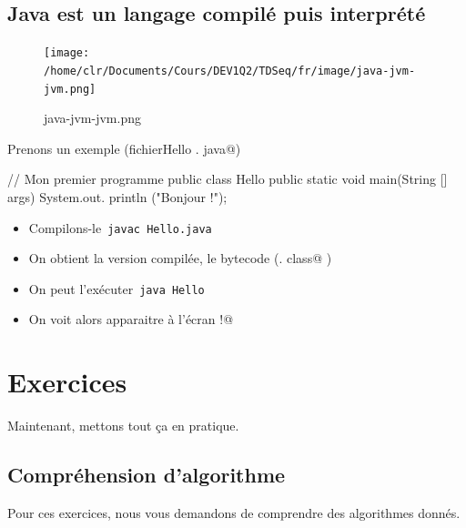 \documentclass[11pt,a4paper]{article}
\begin{document}
            \par
        \subsection{Java est un langage compil\'e puis interpr\'et\'e}\begin{figure}[hbt]
				    \begin{center}
					\texttt{[image: /home/clr/Documents/Cours/DEV1Q2/TDSeq/fr/image/java-jvm-jvm.png]}
						\end{center}
                
                    \caption[java-jvm-jvm.png]{java-jvm-jvm.png}
                \end{figure}
                    
            \par
        
          Prenons un exemple (fichier\verb@ Hello . java@)
          
            \par
        \begin{Java}
// Mon premier programme
public class Hello {
    public static void main(String [] args) {
        System.out. println ("Bonjour !");
    }
}
        \end{Java}
					\begin{itemize}
				
			\item Compilons-le \,\verb|javac Hello.java|\,
			\item On obtient la version compil\'ee, le bytecode (\verb@Hello . class@ )
			\item On peut l'ex\'ecuter \,\verb|java Hello|\,
			\item On voit alors apparaitre \`a l'\'ecran \verb@Bonjour !@
					\end{itemize}
				
            \par
        \section{Exercices}
				Maintenant, mettons tout \c ca en pratique.
      
            \par
        \subsection{Compr\'ehension d'algorithme}
          Pour ces exercices, nous vous demandons de comprendre des algorithmes donn\'es. 
          
\end{document}
